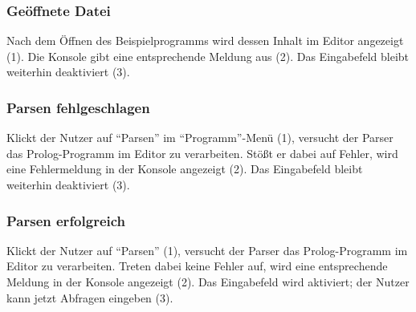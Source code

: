 \documentclass[parskip=full,11pt,twoside]{scrartcl}
\begin{document}
\subsubsection{Geöffnete Datei}

\begin{minipage}{\linewidth}
\end{minipage}

Nach dem Öffnen des Beispielprogramms wird dessen Inhalt im Editor angezeigt (1).
Die Konsole gibt eine entsprechende Meldung aus (2).
Das Eingabefeld bleibt weiterhin deaktiviert (3).

\subsubsection{Parsen fehlgeschlagen}

\begin{minipage}{\linewidth}
\end{minipage}

Klickt der Nutzer auf \enquote{Parsen} im \enquote{Programm}-Menü (1), versucht der Parser das Prolog-Programm im Editor zu verarbeiten.
Stößt er dabei auf Fehler, wird eine Fehlermeldung in der Konsole angezeigt (2).
Das Eingabefeld bleibt weiterhin deaktiviert (3).

\subsubsection{Parsen erfolgreich}

\begin{minipage}{\linewidth}
\end{minipage}

Klickt der Nutzer auf \enquote{Parsen} (1), versucht der Parser das Prolog-Programm im Editor zu verarbeiten.
Treten dabei keine Fehler auf, wird eine entsprechende Meldung in der Konsole angezeigt (2).
Das Eingabefeld wird aktiviert; der Nutzer kann jetzt Abfragen eingeben (3).
\end{document}
